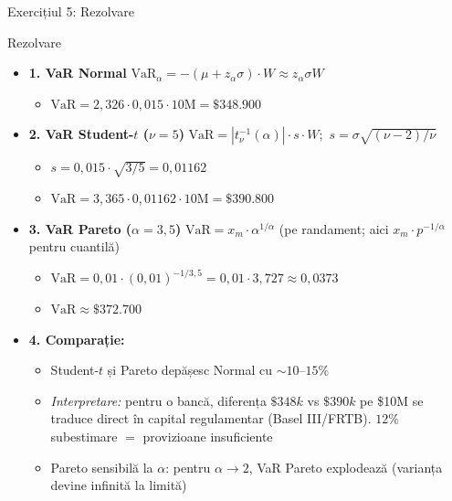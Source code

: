 \documentclass[9pt, aspectratio=169, t]{beamer}
\begin{document}
\begin{frame}[shrink=25]{Exercițiul 5: Rezolvare}
\begin{cminipage}{0.95\textwidth}
\begin{exampleblock}{Rezolvare}
\begin{itemize}\setlength{\itemsep}{0pt}
    \item \textbf{1. VaR Normal} \quad $\text{VaR}_\alpha = -(\mu + z_\alpha \sigma) \cdot W \approx z_\alpha \sigma W$
    \begin{itemize}\setlength{\itemsep}{0pt}
        \item $\text{VaR} = 2{,}326 \cdot 0{,}015 \cdot 10\text{M} = \mathbf{\$348.900}$
    \end{itemize}
    \item \textbf{2. VaR Student-$t$ ($\nu=5$)} \quad $\text{VaR} = |t_\nu^{-1}(\alpha)| \cdot s \cdot W$;\ $s = \sigma\sqrt{(\nu-2)/\nu}$
    \begin{itemize}\setlength{\itemsep}{0pt}
        \item $s = 0{,}015 \cdot \sqrt{3/5} = 0{,}01162$
        \item $\text{VaR} = 3{,}365 \cdot 0{,}01162 \cdot 10\text{M} = \mathbf{\$390.800}$
    \end{itemize}
    \item \textbf{3. VaR Pareto ($\alpha = 3{,}5$)} \quad $\text{VaR} = x_m \cdot \alpha^{1/\alpha}$ (pe randament; aici $x_m \cdot p^{-1/\alpha}$ pentru cuantilă)
    \begin{itemize}\setlength{\itemsep}{0pt}
        \item $\text{VaR} = 0{,}01 \cdot (0{,}01)^{-1/3{,}5} = 0{,}01 \cdot 3{,}727 \approx 0{,}0373$
        \item $\text{VaR} \approx \mathbf{\$372.700}$
    \end{itemize}
    \item \textbf{4. Comparație:}
    \begin{itemize}\setlength{\itemsep}{0pt}
        \item Student-$t$ și Pareto depășesc Normal cu $\sim 10$--$15\%$
        \item \textit{Interpretare:} pentru o bancă, diferența $\$348k$ vs $\$390k$ pe \$10M se traduce direct în capital regulamentar (Basel III/FRTB). $12\%$ subestimare $=$ provizioane insuficiente
        \item Pareto sensibilă la $\alpha$: pentru $\alpha \to 2$, VaR Pareto explodează (varianța devine infinită la limită)
    \end{itemize}

\end{itemize}
\end{exampleblock}
\end{cminipage}
\end{frame}
\end{document}
